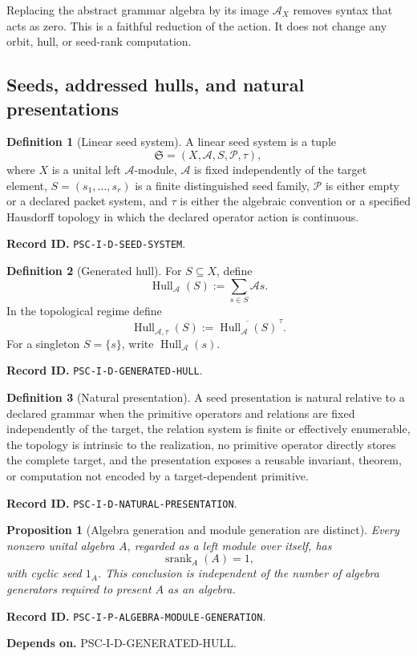 \documentclass[11pt]{article}
\newtheorem{proposition}[proposition]{Proposition}
\theoremstyle{definition}
\newtheorem{definition}[definition]{Definition}
\theoremstyle{remark}
\newcommand{\A}{\mathcal A}
\newcommand{\Pcal}{\mathcal P}
\newcommand{\Hull}{\operatorname{Hull}}
\newcommand{\srank}{\operatorname{srank}}
\newcommand{\cl}[1]{\overline{#1}}
\newcommand{\RecordID}[1]{\par\smallskip\noindent\begingroup\footnotesize\color{PSCGray}\raggedright\textbf{Record ID.} \nolinkurl{#1}.\par\endgroup}
\newcommand{\Depends}[1]{\par\noindent\begingroup\footnotesize\color{PSCGray}\raggedright\textbf{Depends on.} #1\par\endgroup}
\begin{document}
\begin{keyidea}
Replacing the abstract grammar algebra by its image \(\A_X\) removes syntax that acts as zero.  This is a faithful reduction of the action.  It does not change any orbit, hull, or seed-rank computation.
\end{keyidea}


\subsection{Seeds, addressed hulls, and natural presentations}
\begin{definition}[Linear seed system]
\label{def:seed-system}
A linear seed system is a tuple
\[
\mathfrak S=(X,\A,S,\Pcal,\tau),
\]
where $X$ is a unital left $\A$-module, $\A$ is fixed independently of the target element, $S=(s_1,\ldots,s_r)$ is a finite distinguished seed family, $\Pcal$ is either empty or a declared packet system, and $\tau$ is either the algebraic convention or a specified Hausdorff topology in which the declared operator action is continuous.
\end{definition}
\RecordID{PSC-I-D-SEED-SYSTEM}

\begin{definition}[Generated hull]
\label{def:generated-hull}
For $S\subseteq X$, define
\[
\Hull_{\A}(S):=\sum_{s\in S}\A s.
\]
In the topological regime define
\[
\Hull_{\A,\tau}(S):=\cl{\Hull_{\A}(S)}^{\,\tau}.
\]
For a singleton $S=\{s\}$, write $\Hull_{\A}(s)$.
\end{definition}
\RecordID{PSC-I-D-GENERATED-HULL}

\begin{definition}[Natural presentation]
\label{def:natural-presentation}
A seed presentation is natural relative to a declared grammar when the primitive operators and relations are fixed independently of the target, the relation system is finite or effectively enumerable, the topology is intrinsic to the realization, no primitive operator directly stores the complete target, and the presentation exposes a reusable invariant, theorem, or computation not encoded by a target-dependent primitive.
\end{definition}
\RecordID{PSC-I-D-NATURAL-PRESENTATION}

\begin{proposition}[Algebra generation and module generation are distinct]
\label{prop:algebra-module-generation}
Every nonzero unital algebra $A$, regarded as a left module over itself, has
\[
\srank_A(A)=1,
\]
with cyclic seed $1_A$.  This conclusion is independent of the number of algebra generators required to present $A$ as an algebra.
\end{proposition}
\RecordID{PSC-I-P-ALGEBRA-MODULE-GENERATION}
\Depends{PSC-I-D-GENERATED-HULL.}
\end{document}
